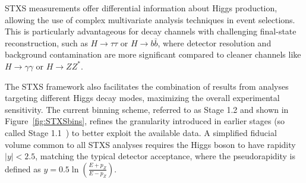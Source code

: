 STXS measurements offer differential information about Higgs production, allowing the use of complex multivariate analysis techniques in event selections. This is particularly advantageous for decay channels with challenging final-state reconstruction, such as $H \to \tau\tau$ or $H \to b\bar{b}$, where detector resolution and background contamination are more significant compared to cleaner channels like $H \to \gamma\gamma$ or $H \to ZZ^*$.

The STXS framework also facilitates the combination of results from analyses targeting different Higgs decay modes, maximizing the overall experimental sensitivity. The current binning scheme, referred to as Stage 1.2 and shown in Figure~\ref{fig:STXSbins}, refines the granularity introduced in earlier stages (so called Stage 1.1~\cite{STXS11}) to better exploit the available data. A simplified fiducial volume common to all STXS analyses requires the Higgs boson to have rapidity $|y| < 2.5$, matching the typical detector acceptance, where the pseudorapidity is defined as $y = 0.5 \ln{\left( \frac{E+p_Z}{E-p_Z} \right)}$.

